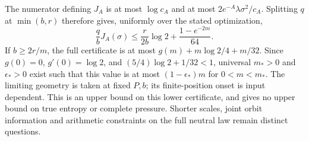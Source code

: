 The numerator defining $J_A$ is at most $\log c_A$ and at most $2e^{-A}\lambda\sigma^2/c_A$.
Splitting $q$ at $\min(b,r)$ therefore gives, uniformly over the stated optimization,
\[
 \frac qb J_A(\sigma)
 \le\frac{r}{2b}\log2+\frac{1-e^{-2m}}{64}.
\]
If $b\ge2r/m$, the full certificate is at most $g(m)+m\log2/4+m/32$.
Since $g(0)=0$, $g'(0)=\log2$, and $(5/4)\log2+1/32<1$, universal $m_*>0$ and $\epsilon_*>0$ exist such that this value is at most $(1-\epsilon_*)m$ for $0<m<m_*$.
The limiting geometry is taken at fixed $P,b$; its finite-position onset is input dependent.
This is an upper bound on this lower certificate, and gives no upper bound on true entropy or complete pressure.
Shorter scales, joint orbit information and arithmetic constraints on the full neutral law remain distinct questions.
